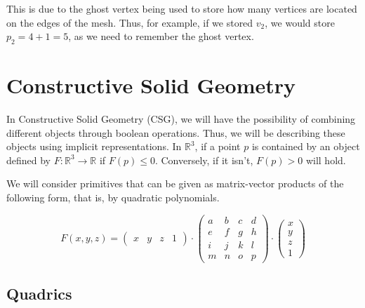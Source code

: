 \documentclass[english]{panikzettel}
\begin{document}
This is due to the ghost vertex being used to store how many vertices are located on the edges of the mesh. Thus, for example, if we stored $v_2$, we would store $p_2 = 4 + 1 = 5$, as we need to remember the ghost vertex.

\section{Constructive Solid Geometry}

In Constructive Solid Geometry (CSG), we will have the possibility of combining different objects through boolean operations. Thus, we will be describing these objects using implicit representations. In $\mathbb{R}^3$, if a point $p$ is contained by an object defined by $F: \mathbb{R}^3 \to \mathbb{R}$ if $F(p) \le 0$. Conversely, if it isn't, $F(p) > 0$ will hold.

We will consider primitives that can be given as matrix-vector products of the following form, that is, by quadratic polynomials.

$$F(x,y,z) = \begin{pmatrix} x & y & z & 1 \end{pmatrix} \cdot
\begin{pmatrix}
a & b & c & d \\
e & f & g & h \\
i & j & k & l \\
m & n & o & p
\end{pmatrix} \cdot
\begin{pmatrix} x \\ y \\ z \\ 1 \end{pmatrix}$$

\subsection{Quadrics}
\end{document}
